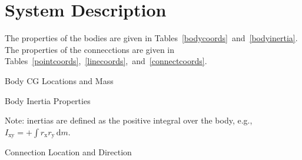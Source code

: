\section{System Description}
The properties of the bodies are given in Tables~\ref{bodycoords}~and~\ref{bodyinertia}.
The properties of the connecctions are given in Tables~\ref{pointcoords},~\ref{linecoords},~and~\ref{connectcoords}.
\begin{table}[ht]
\begin{center}
\begin{threeparttable}
\begin{footnotesize}
\caption{Body CG Locations and Mass}
\label{bodycoords}
\end{footnotesize}
\end{threeparttable}
\end{center}
\end{table}
\begin{table}[ht]
\begin{center}
\begin{threeparttable}
\begin{footnotesize}
\caption{Body Inertia Properties}
\label{bodyinertia}
\begin{tablenotes}
\item Note: inertias are defined as the positive integral over the body, e.g., $I_{\textrm{xy}}=+\! \int \! r_{\textrm{x}}r_{\textrm{y}} \,\text{d}m $.
\end{tablenotes}
\end{footnotesize}
\end{threeparttable}
\end{center}
\end{table}
\begin{table}[ht]
\begin{center}
\begin{threeparttable}
\begin{footnotesize}
\caption{Connection Location and Direction}
\label{pointcoords}
\end{footnotesize}
\end{threeparttable}
\end{center}
\end{table}
